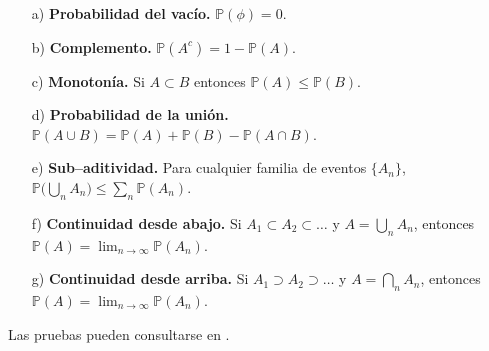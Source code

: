 \documentclass[../Main.tex]{subfiles}
\begin{document}
\begin{itemize}
    \item [a)] \textbf{Probabilidad del vacío.}  \(\mathbb{P}(\phi) = 0\).
    \item[b)] \textbf{Complemento.}  
          \(\mathbb{P}(A^{c}) = 1 - \mathbb{P}(A)\).
    \item [c)]
    \textbf{Monotonía.}  
          Si \(A\subset B\) entonces \(\mathbb{P}(A)\le \mathbb{P}(B)\).
          \item [d)]
    \textbf{Probabilidad de la unión.}  
          \(\mathbb{P}(A\cup B) = \mathbb{P}(A)+\mathbb{P}(B)-\mathbb{P}(A\cap B)\).
    \item[e)]  \textbf{Sub–aditividad.}  
          Para cualquier familia de eventos \(\{A_n\}\),
          \(\mathbb{P}\bigl(\bigcup_{n} A_n\bigr)\le\sum_{n} \mathbb{P}(A_n)\).
    \item [f)] \textbf{Continuidad desde abajo.}  
          Si \(A_1\subset A_2\subset\dots\) y \(A=\bigcup_{n}A_n\), entonces
          \(\displaystyle \mathbb{P}(A)=\lim_{n\to\infty}\mathbb{P}(A_n)\).
    \item [g)] \textbf{Continuidad desde arriba.}  
          Si \(A_1\supset A_2\supset\dots\) y \(A=\bigcap_{n}A_n\), entonces
          \(\displaystyle \mathbb{P}(A)=\lim_{n\to\infty}\mathbb{P}(A_n)\).
\end{itemize}
Las pruebas pueden consultarse en \cite{grimmett2001probability,Ross_07}.

\end{document}
